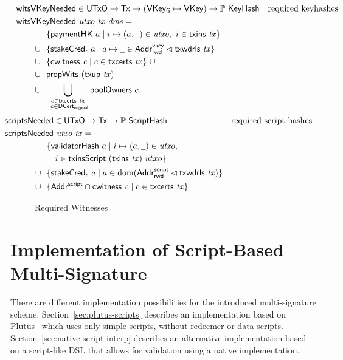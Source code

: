 \documentclass[11pt,a4paper,dvipsnames]{article}
\newcommand{\Tx}{\type{Tx}}
\newcommand{\UTxO}{\type{UTxO}}
\newcommand{\DCertRegPool}{\type{DCert_{regpool}}}
\newcommand{\AddrRWDVKey}{\type{Addr_{rwd}^{vkey}}}
\newcommand{\AddrRWDScr}{\type{Addr_{rwd}^{script}}}
\newcommand{\AddrScr}{\type{Addr^{script}}}
\newcommand{\HashScr}{\type{ScriptHash}}
\newcommand{\VKey}{\type{VKey}}
\newcommand{\VKeyGen}{\type{VKey_G}}
\newcommand{\KeyHash}{\type{KeyHash}}
\newcommand{\txins}[1]{\fun{txins}~ \var{#1}}
\newcommand{\txcerts}[1]{\fun{txcerts}~ \var{#1}}
\newcommand{\cwitness}[1]{\fun{cwitness}~ \var{#1}}
\newcommand{\txwdrls}[1]{\fun{txwdrls}~ \var{#1}}
\newcommand{\wcard}[0]{\underline{\phantom{a}}}
\theoremstyle{definition}
\begin{document}
\begin{figure}[htb]
  \begin{align*}
    & \hspace{-1cm}\fun{witsVKeyNeeded} \in \UTxO \to \Tx \to (\VKeyGen\mapsto\VKey) \to
      \powerset{\KeyHash}
    & \text{required keyhashes} \\
    &  \hspace{-1cm}\fun{witsVKeyNeeded}~\var{utxo}~\var{tx}~\var{dms} = \\
    & ~~\{ \fun{paymentHK}~a \mid i \mapsto (a, \wcard) \in \var{utxo},~i\in\txins{tx} \} \\
    \cup & ~~\{\fun{stakeCred_r}~a \mid a\mapsto \wcard \in \AddrRWDVKey
      \restrictdom \txwdrls{tx}\} \\
    \cup & ~~\{\cwitness{c} \mid c \in \txcerts{tx}\}~\cup \\
    \cup & ~~\fun{propWits}~(\fun{txup}~\var{tx}) \\
    \cup & ~~\bigcup_{\substack{c \in \txcerts{tx} \\ ~c \in\DCertRegPool}} \fun{poolOwners}~{c}
  \end{align*}
  \begin{align*}
    & \hspace{-1.5cm}\fun{scriptsNeeded} \in \UTxO \to \Tx \to
      \powerset{\HashScr}
    & \text{required script hashes} \\
    &  \hspace{-1.5cm}\fun{scriptsNeeded}~\var{utxo}~\var{tx} = \\
    & ~~\{ \fun{validatorHash}~a \mid i \mapsto (a, \wcard) \in \var{utxo},\\
    & ~~~~~i\in\fun{txinsScript}~{(\fun{txins~\var{tx}})}~{utxo}\} \\
    \cup & ~~\{ \fun{stakeCred_{r}}~\var{a} \mid a \in \dom (\AddrRWDScr
           \restrictdom \fun{txwdrls}~\var{tx}) \} \\
    \cup & ~~\{\AddrScr \cap \fun{cwitness}~\var{c} \mid c \in \fun{txcerts}~\var{tx}\}
  \end{align*}
  \caption{Required Witnesses}
  \label{fig:functions-witnesses}
\end{figure}

\section{Implementation of Script-Based Multi-Signature}
\label{sec:altern-impl}

There are different implementation possibilities for the introduced
multi-signature scheme. Section~\ref{sec:plutus-scripts} describes an
implementation based on Plutus~\cite{plutus_eutxo} which uses only simple
scripts, without redeemer or data
scripts. Section~\ref{sec:native-script-interp} describes an alternative
implementation based on a script-like DSL that allows for validation using a
native implementation.
\end{document}

